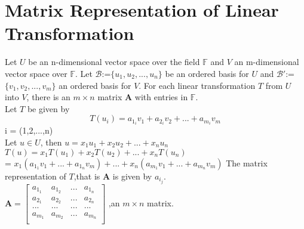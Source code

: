 \documentclass[12pt]{article}
\theoremstyle{definition}
\begin{document}
	\section{Matrix Representation of Linear Transformation}
	 Let $U$ be an n-dimensional vector space over the field $ \mathbb{F}$ and $V$ an m-dimensional vector space over $\mathbb{F}$. Let $\mathcal{B}$:=$\{u_1,u_2,...,u_n\}$ be an ordered basis for $U$ and $\mathcal{B\prime}$:=$\{v_1,v_2,...,v_m\}$ an ordered basis for $V$. For each linear transformation $T$ from $U$ into $V$, there is an $ m\times n$ matrix $\mathbf{A}$ with entries in $\mathbb{F}$.\\
	 Let $T$ be given by
 	 $$ T(u_{i})=a_{1_{i}}v_1+a_{2_{i}}v_2+...+a_{m_{i}}v_m $$
	  i = (1,2,...,n)\\
	  Let $u\in U$, then $u = x_1u_1+x_2u_2+...+x_nu_n$\\
	  $T(u) = x_1T(u_1)+x_2T(u_2)+...+x_nT(u_n)$\\
	  \hspace*{1cm}= $x_1(a_{1_{1}}v_1+...+a_{1_{n}}v_m	)+...+x_n(a_{m_{1}}v_1+...+a_{m_{n}}v_m	)$
	  The matrix representation of $T$,that is $\mathbf{A}$ is given by $a_{i_{j}}.$\\
	  $
	  \mathbf{A} =
	  \begin{bmatrix}
	  a_{1_{1}} & a_{1_{2}} & ... &a_{1_{n}}\\
	  a_{2_{1}} & a_{2_{2}} & ... &a_{2_{n}}\\
	  ...&...&...&...\\
	  a_{m_{1}} & a_{m_{2}} & ... &a_{m_{n}}\\
	  \end{bmatrix}
	  $
	  ,an $m\times n$ matrix.
	  
\end{document}
